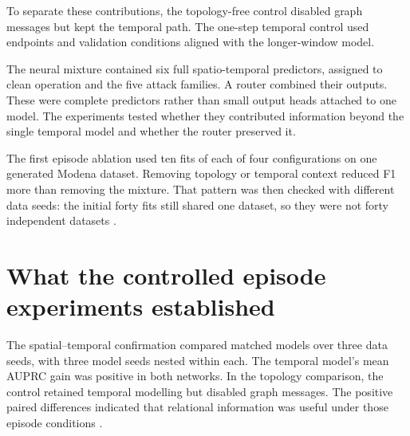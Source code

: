 To separate these contributions, the topology-free control disabled graph messages but kept the temporal path. The one-step temporal control used endpoints and validation conditions aligned with the longer-window model.

The neural mixture contained six full spatio-temporal predictors, assigned to clean operation and the five attack families. A router combined their outputs. These were complete predictors rather than small output heads attached to one model. The experiments tested whether they contributed information beyond the single temporal model and whether the router preserved it.


The first episode ablation used ten fits of each of four configurations on one generated Modena dataset. Removing topology or temporal context reduced F1 more than removing the mixture. That pattern was then checked with different data seeds: the initial forty fits still shared one dataset, so they were not forty independent datasets \cite{projectepisode}.

\section{What the controlled episode experiments established}
The spatial--temporal confirmation compared matched models over three data seeds, with three model seeds nested within each. The temporal model's mean AUPRC gain was positive in both networks. In the topology comparison, the control retained temporal modelling but disabled graph messages. The positive paired differences indicated that relational information was useful under those episode conditions \cite{projectepisode}.

